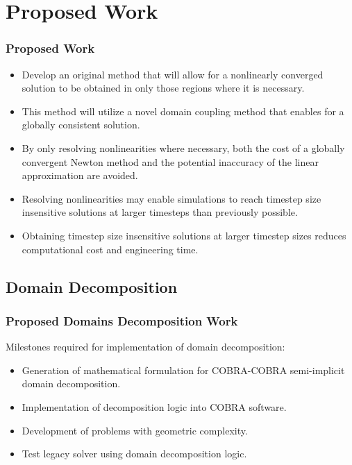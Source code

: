 \documentclass[compress,xcolor=table]{beamer}
\begin{document}
\section[Proposed Work]{Proposed Work}
\begin{frame}
\frametitle{Proposed Work}

\begin{itemize}
\item{Develop an original method that will allow for a nonlinearly converged solution to be obtained in only those regions where it is necessary.}
\item{This method will utilize a novel domain coupling method that enables for a globally consistent solution.}
\item{By only resolving nonlinearities where necessary, both the cost of a globally convergent Newton method and the potential inaccuracy of the linear approximation are avoided.}
\item{Resolving nonlinearities may enable simulations to reach timestep size insensitive solutions at larger timesteps than previously possible.}
\item{Obtaining timestep size insensitive solutions at larger timestep sizes reduces computational cost and engineering time.}
\end{itemize}

\end{frame}
\subsection[Domain Decomposition]{Domain Decomposition}
\begin{frame}
\frametitle{Proposed Domains Decomposition Work}

Milestones required for implementation of domain decomposition:

\begin{itemize}
\item{Generation of mathematical formulation for COBRA-COBRA semi-implicit domain decomposition.}
\item{Implementation of decomposition logic into COBRA software.}
\item{Development of problems with geometric complexity.}
\item{Test legacy solver using domain decomposition logic.} 
\end{itemize}

\end{frame}
\end{document}
